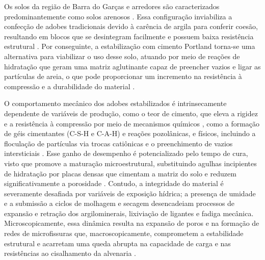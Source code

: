
Os solos da região de Barra do Garças e arredores são caracterizados predominantemente como solos arenosos \cite{monteiro2022,Barroso2019, Barroso2023, Santos2018, Silva2019}. Essa configuração inviabiliza a confecção de adobes tradicionais devido à carência de argila para conferir coesão, resultando em blocos que se desintegram facilmente e possuem baixa resistência estrutural \cite{Junior2021, Silva2019}. Por conseguinte, a estabilização com cimento Portland torna-se uma alternativa para viabilizar o uso desse solo, atuando por meio de reações de hidratação que geram uma matriz aglutinante capaz de preencher vazios e ligar as partículas de areia, o que pode proporcionar um incremento na resistência à compressão e a durabilidade do material \cite{Novato2019, Silva2019}.


O comportamento mecânico dos adobes estabilizados é intrinsecamente dependente de variáveis de produção, como o teor de cimento, que eleva a rigidez e a resistência à compressão por meio de mecanismos químicos \cite{Roshan2022, Zhang2025, Santos2018, Aqtash2021}, como a formação de géis cimentantes (C-S-H e C-A-H) e reações pozolânicas, e físicos, incluindo a floculação de partículas via trocas catiônicas e o preenchimento de vazios intersticiais \cite{Zhang2025, Ding2021, Messis2022}. Esse ganho de desempenho é potencializado pelo tempo de cura, visto que promove a maturação microestrutural, substituindo agulhas incipientes de hidratação por placas densas que cimentam a matriz do solo e reduzem significativamente a porosidade \cite{Yang2024, Wang2022}. Contudo, a integridade do material é severamente desafiada por variáveis de exposição hídrica; a presença de umidade e a submissão a ciclos de molhagem e secagem desencadeiam processos de expansão e retração dos argilominerais, lixiviação de ligantes e fadiga mecânica. Microscopicamente, essa dinâmica resulta na expansão de poros e na formação de redes de microfissuras que, macroscopicamente, comprometem a estabilidade estrutural e acarretam uma queda abrupta na capacidade de carga e nas resistências ao cisalhamento da alvenaria \cite{Liu2023, Chen2024}.

